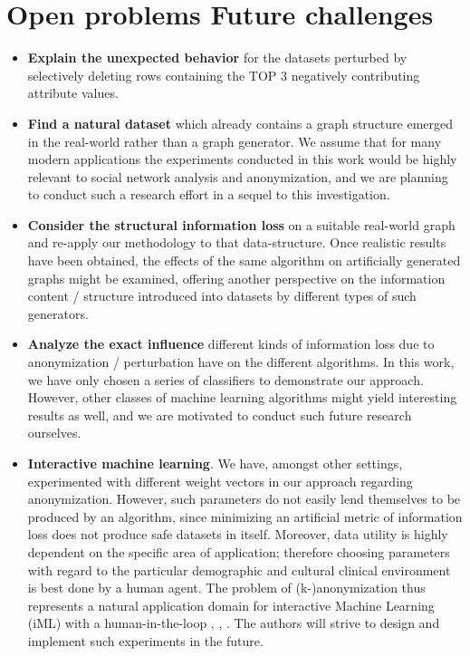 \documentclass{llncs}
\begin{document}
\section{Open problems Future challenges}
\label{sect:op_fc}

\begin{itemize}
	\item \textbf{Explain the unexpected behavior} for the datasets perturbed by selectively deleting rows containing the TOP 3 negatively contributing attribute values.
	
	\item \textbf{Find a natural dataset} which already contains a graph structure emerged in the real-world rather than a graph generator. We assume that for many modern applications the experiments conducted in this work would be highly relevant to social network analysis and anonymization, and we are planning to conduct such a research effort in a sequel to this investigation.
	
	\item \textbf{Consider the structural information loss} on a suitable real-world graph and re-apply our methodology to that data-structure. Once realistic results have been obtained, the effects of the same algorithm on artificially generated graphs might be examined, offering another perspective on the information content / structure introduced into datasets by different types of such generators.
	
	\item \textbf{Analyze the exact influence} different kinds of information loss due to anonymization / perturbation have on the different algorithms. In this work, we have only chosen a series of classifiers to demonstrate our approach. However, other classes of machine learning algorithms might yield interesting results as well, and we are motivated to conduct such future research ourselves.
	
	\item \textbf{Interactive machine learning}. We have, amongst other settings, experimented with different weight vectors in our approach regarding anonymization. However, such parameters do not easily lend themselves to be produced by an algorithm, since minimizing an artificial metric of information loss  does not produce safe datasets in itself. Moreover, data utility is highly dependent on the specific area of application; therefore choosing parameters with regard to the particular demographic and cultural clinical environment is best done by a human agent. The problem of (k-)anonymization thus represents a natural application domain for interactive Machine Learning (iML) with a human-in-the-loop \cite{Holzinger:2016:iML}, \cite{Kieseberg:2016:Doctor-in-the-Loop}, \cite{iMLExperiment}. The authors will strive to design and implement such experiments in the future.
\end{itemize}
\end{document}
